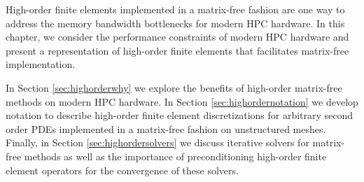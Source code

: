 High-order finite elements implemented in a matrix-free fashion are one way to address the memory bandwidth bottlenecks for modern HPC hardware.
In this chapter, we consider the performance constraints of modern HPC hardware and present a representation of high-order finite elements that facilitates matrix-free implementation.

In Section \ref{sec:highorderwhy} we explore the benefits of high-order matrix-free methods on modern HPC hardware.
In Section \ref{sec:highordernotation} we develop notation to describe high-order finite element discretizations for arbitrary second order PDEs implemented in a matrix-free fashion on unstructured meshes.
Finally, in Section \ref{sec:highordersolvers} we discuss iterative solvers for matrix-free methods as well as the importance of preconditioning high-order finite element operators for the convergence of these solvers.
